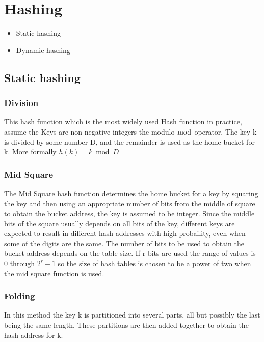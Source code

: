 \section{Hashing}\label{hashing}

\begin{itemize}
\item
  Static hashing
\item
  Dynamic hashing
\end{itemize}

\subsection{Static hashing}\label{static-hashing}

\subsubsection{Division}\label{division}

This hash function which is the most widely used Hash function in
practice, assume the Keys are non-negative integers the modulo $ \bmod $
operator. The key k is divided by some number D, and the remainder is
used as the home bucket for k. More formally $ h(k) = k \bmod D $

\subsubsection{Mid Square}\label{mid-square}

The Mid Square hash function determines the home bucket for a key by
squaring the key and then using an appropriate number of bits from the
middle of square to obtain the bucket address, the key is assumed to be
integer. Since the middle bits of the square usually depends on all bits
of the key, different keys are expected to result in different hash
addresses with high probaility, even when some of the digits are the
same. The number of bits to be used to obtain the bucket address depends
on the table size. If r bits are used the range of values is 0 through
$ 2^r - 1 $ so the size of hash tables is chosen to be a power of two
when the mid square function is used.

\subsubsection{Folding}\label{folding}

In this method the key k is partitioned into several parts, all but
possibly the last being the same length. These partitions are then added
together to obtain the hash address for k.


